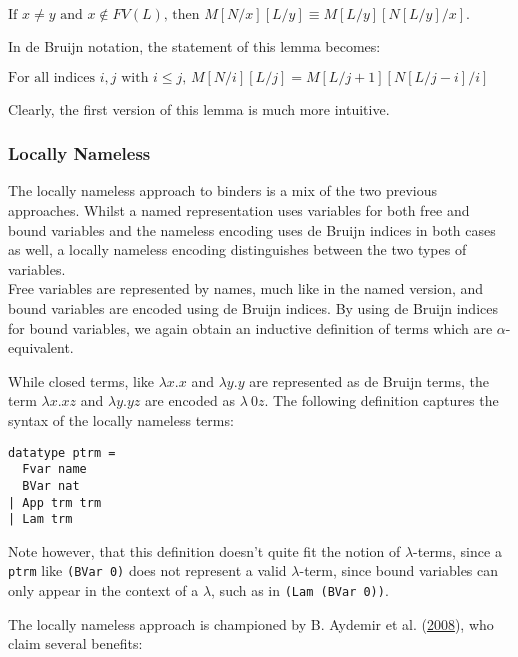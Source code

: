 \documentclass[a4paper, 12pt, twoside]{style/ociamthesis}
\theoremstyle{plain}
\theoremstyle{definition}
\theoremstyle{remark}
\begin{document}
\begin{center}
$\text{If }x \neq y\text{ and }x \not\in FV(L)\text{, then }
M[N/x][L/y] \equiv M[L/y][N[L/y]/x].$
\end{center}

In de Bruijn notation, the statement of this lemma becomes:

\begin{center}
$\text{For all indices }i, j\text{ with }i \leq j\text{, }M[N/i][L/j] = M[L/j + 1][N[L/j - i]/i]$
\end{center}

Clearly, the first version of this lemma is much more intuitive.

\subsubsection{Locally Nameless}\label{locally-nameless}

The locally nameless approach to binders is a mix of the two previous
approaches. Whilst a named representation uses variables for both free
and bound variables and the nameless encoding uses de Bruijn indices in
both cases as well, a locally nameless encoding distinguishes between
the two types of variables.\\
Free variables are represented by names, much like in the named version,
and bound variables are encoded using de Bruijn indices. By using de
Bruijn indices for bound variables, we again obtain an inductive
definition of terms which are \(\alpha\)-equivalent.

While closed terms, like \(\lambda x.x\) and \(\lambda y.y\) are
represented as de Bruijn terms, the term \(\lambda x.xz\) and
\(\lambda y.yz\) are encoded as \(\lambda\ 0z\). The following
definition captures the syntax of the locally nameless terms:

\begin{verbatim}
datatype ptrm =
  Fvar name
  BVar nat
| App trm trm
| Lam trm
\end{verbatim}

Note however, that this definition doesn't quite fit the notion of
\(\lambda\)-terms, since a \texttt{ptrm} like \texttt{(BVar 0)} does not
represent a valid \(\lambda\)-term, since bound variables can only
appear in the context of a \(\lambda\), such as in
\texttt{(Lam (BVar 0))}.

The locally nameless approach is championed by B. Aydemir et al.
(\protect\hyperlink{ref-aydemir08}{2008}), who claim several benefits:
\end{document}
